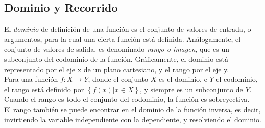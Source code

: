 \subsection{Dominio y Recorrido}
El \textit{dominio} de definición de una función es el conjunto de valores de entrada, o argumentos, para la cual una cierta función está definida. Análogamente, el conjunto de valores de salida, es denominado \textit{rango o imagen}, que es un subconjunto del codominio de la función. Gráficamente, el dominio está representado por el eje x de un plano cartesiano, y el rango por el eje y.\\

Para una función $f: X \rightarrow Y$, donde el conjunto $X$ es el dominio, e $Y$ el codominio, el rango está definido por $\left\{ f(x) | x \in X \right\}$, y siempre es un subconjunto de $Y$. Cuando el rango es todo el conjunto del codominio, la función es sobreyectiva.\\

El rango también se puede encontrar en el dominio de la función inversa, es decir, invirtiendo la variable independiente con la dependiente, y resolviendo el dominio.\\
